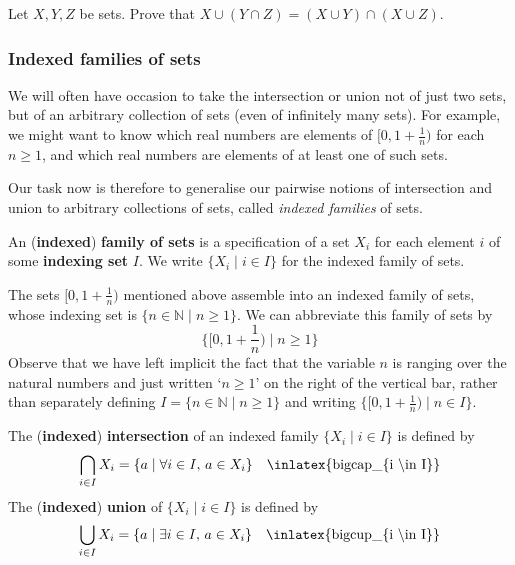 \begin{exercise}
\label{exUnionDistributesOverIntersection}
Let $X,Y,Z$ be sets. Prove that $X \cup (Y \cap Z) = (X \cup Y) \cap (X \cup Z)$.
\end{exercise}

\subsubsection*{Indexed families of sets}

We will often have occasion to take the intersection or union not of just two sets, but of an arbitrary collection of sets (even of infinitely many sets). For example, we might want to know which real numbers are elements of $[0, 1+\frac{1}{n})$ for each $n \ge 1$, and which real numbers are elements of at least one of such sets.

Our task now is therefore to generalise our pairwise notions of intersection and union to arbitrary collections of sets, called \textit{indexed families} of sets.

\begin{definition}
\label{defIndexedFamily}
An (\textbf{indexed}) \textbf{family of sets} is a specification of a set $X_i$ for each element $i$ of some \textbf{indexing set} $I$. We write $\{ X_i \mid i \in I \}$ for the indexed family of sets.
\end{definition}

\begin{example}
\label{exIndexedFamilyOfHalfOpenIntervals}
The sets $[0,1+\frac{1}{n})$ mentioned above assemble into an indexed family of sets, whose indexing set is $\{ n \in \mathbb{N} \mid n \ge 1 \}$. We can abbreviate this family of sets by
\[ \{ [0,1+\textstyle\frac{1}{n}) \mid n \ge 1 \} \]
Observe that we have left implicit the fact that the variable $n$ is ranging over the natural numbers and just written `$n \ge 1$' on the right of the vertical bar, rather than separately defining $I = \{ n \in \mathbb{N} \mid n \ge 1 \}$ and writing $\{ [0,1+\frac{1}{n}) \mid n \in I \}$.
\end{example}

\begin{definition}
\label{defIndexedIntersectionUnion}
The (\textbf{indexed}) \textbf{intersection} of an indexed family $\{ X_i \mid i \in I \}$ is defined by
\[ \bigcap_{i \in I} X_i = \{ a \mid \forall i \in I,\, a \in X_i \} \quad \text{\inlatex{bigcap\_\{i \textbackslash{}in I\}}} \]
The (\textbf{indexed}) \textbf{union} of $\{ X_i \mid i \in I \}$ is defined by
\[ \bigcup_{i \in I} X_i = \{ a \mid \exists i \in I,\, a \in X_i \} \quad \text{\inlatex{bigcup\_\{i \textbackslash{}in I\}}} \]
\end{definition}

